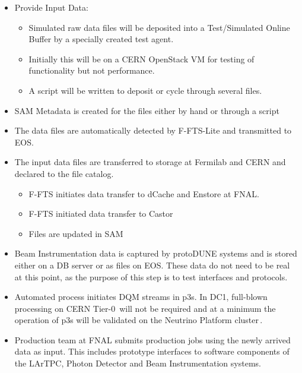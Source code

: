 \documentclass[pdftex,12pt,letter]{article}
\newcommand{\pd}{protoDUNE\xspace}
\begin{document}
\begin{itemize}

\item Provide Input Data: 
\begin{itemize}
\item Simulated raw data files will be deposited into a Test/Simulated Online Buffer by a specially created test agent.
\item  Initially this will be on a CERN OpenStack VM for testing of functionality but not performance. 
\item A script will be written to deposit or cycle through several files. 
\end{itemize}
\item SAM Metadata is created for the files either by hand or through a script

\item The data files are automatically detected by F-FTS-Lite and transmitted to EOS.

\item The input data files are transferred to storage at Fermilab and CERN and declared to the file catalog.
\begin{itemize}
\item F-FTS initiates data transfer to dCache and Enstore at FNAL. 
\item F-FTS initiated data transfer to Castor
\item Files are updated in SAM
\end{itemize}

\item Beam Instrumentation data is captured by \pd systems and is stored either on a DB server or as files on EOS.
These data do not need to be real at this point, as the purpose of this step is to test interfaces and protocols.


\item Automated process initiates DQM streams in p3s. In DC1, full-blown processing on CERN Tier-0\,\cite{lxbatch}
will not be required and at a minimum the operation of p3s will be validated on the Neutrino Platform cluster\,\cite{neut}.

\item Production team at FNAL submits production jobs using the newly arrived data as input. This includes prototype interfaces
to software components of the LArTPC, Photon Detector and Beam Instrumentation systems.

\end{itemize}
\end{document}
